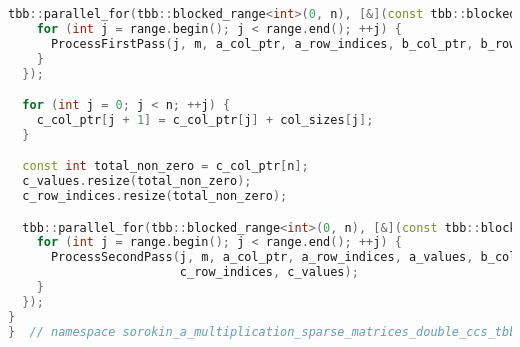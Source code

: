 \documentclass[12pt]{article}
\begin{document}
\begin{lstlisting}[language=C++]
  tbb::parallel_for(tbb::blocked_range<int>(0, n), [&](const tbb::blocked_range<int>& range) {
    for (int j = range.begin(); j < range.end(); ++j) {
      ProcessFirstPass(j, m, a_col_ptr, a_row_indices, b_col_ptr, b_row_indices, col_sizes);
    }
  });

  for (int j = 0; j < n; ++j) {
    c_col_ptr[j + 1] = c_col_ptr[j] + col_sizes[j];
  }

  const int total_non_zero = c_col_ptr[n];
  c_values.resize(total_non_zero);
  c_row_indices.resize(total_non_zero);

  tbb::parallel_for(tbb::blocked_range<int>(0, n), [&](const tbb::blocked_range<int>& range) {
    for (int j = range.begin(); j < range.end(); ++j) {
      ProcessSecondPass(j, m, a_col_ptr, a_row_indices, a_values, b_col_ptr, b_row_indices, b_values, c_col_ptr,
                        c_row_indices, c_values);
    }
  });
}
}  // namespace sorokin_a_multiplication_sparse_matrices_double_ccs_tbb

\end{lstlisting}
\end{document}
